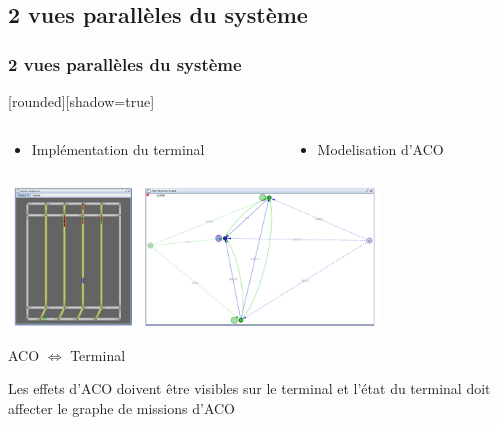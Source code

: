 \documentclass{beamer}
\begin{document}
\subsection*{2 vues parallèles du système}
\begin{frame}
\frametitle{2 vues parallèles du système}
	[rounded][shadow=true]
 	\begin{columns}
	 	\begin{column}[l]{6cm}
	 		\begin{itemize}
				 \item Implémentation du terminal
			\end{itemize}
		\end{column}
		\begin{column}[r]{6cm}
			\begin{itemize}
				  \item Modelisation d'ACO\cite{Dutot2007}
			\end{itemize}
		\end{column}
 	\end{columns}
	\begin{center} \includegraphics[height=3.7cm]{fig/terminalEtGraphe.png} \end{center}

	\begin{block}{ACO $\Longleftrightarrow$ Terminal}
		\begin{center}
			Les effets d'ACO doivent être visibles sur le terminal et l'état du terminal doit affecter le graphe de missions d'ACO
	 	\end{center}
	\end{block}
\end{frame}
\end{document}
